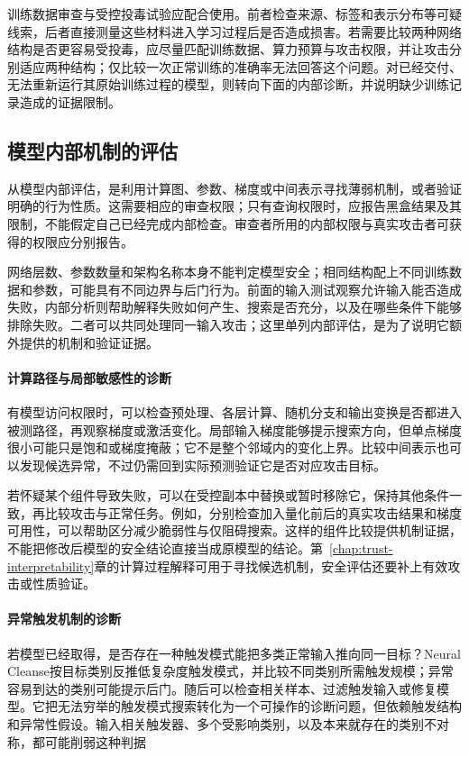 训练数据审查与受控投毒试验应配合使用。前者检查来源、标签和表示分布等可疑线索，后者直接测量这些材料进入学习过程后是否造成损害。若需要比较两种网络结构是否更容易受投毒，应尽量匹配训练数据、算力预算与攻击权限，并让攻击分别适应两种结构；仅比较一次正常训练的准确率无法回答这个问题。对已经交付、无法重新运行其原始训练过程的模型，则转向下面的内部诊断，并说明缺少训练记录造成的证据限制。

\subsection{模型内部机制的评估}
\label{sec:security-model-test}

从模型内部评估，是利用计算图、参数、梯度或中间表示寻找薄弱机制，或者验证明确的行为性质。这需要相应的审查权限；只有查询权限时，应报告黑盒结果及其限制，不能假定自己已经完成内部检查。审查者所用的内部权限与真实攻击者可获得的权限应分别报告。

网络层数、参数数量和架构名称本身不能判定模型安全；相同结构配上不同训练数据和参数，可能具有不同边界与后门行为。前面的输入测试观察允许输入能否造成失败，内部分析则帮助解释失败如何产生、搜索是否充分，以及在哪些条件下能够排除失败。二者可以共同处理同一输入攻击；这里单列内部评估，是为了说明它额外提供的机制和验证证据。

\paragraph{计算路径与局部敏感性的诊断}

有模型访问权限时，可以检查预处理、各层计算、随机分支和输出变换是否都进入被测路径，再观察梯度或激活变化。局部输入梯度能够提示搜索方向，但单点梯度很小可能只是饱和或梯度掩蔽；它不是整个邻域内的变化上界。比较中间表示也可以发现候选异常，不过仍需回到实际预测验证它是否对应攻击目标。

若怀疑某个组件导致失败，可以在受控副本中替换或暂时移除它，保持其他条件一致，再比较攻击与正常任务。例如，分别检查加入量化前后的真实攻击结果和梯度可用性，可以帮助区分减少脆弱性与仅阻碍搜索。这样的组件比较提供机制证据，不能把修改后模型的安全结论直接当成原模型的结论。第~\ref{chap:trust-interpretability}章的计算过程解释可用于寻找候选机制，安全评估还要补上有效攻击或性质验证。

\paragraph{异常触发机制的诊断}

若模型已经取得，是否存在一种触发模式能把多类正常输入推向同一目标？Neural Cleanse按目标类别反推低复杂度触发模式，并比较不同类别所需触发规模；异常容易到达的类别可能提示后门。随后可以检查相关样本、过滤触发输入或修复模型。它把无法穷举的触发模式搜索转化为一个可操作的诊断问题，但依赖触发结构和异常性假设。输入相关触发器、多个受影响类别，以及本来就存在的类别不对称，都可能削弱这种判据

